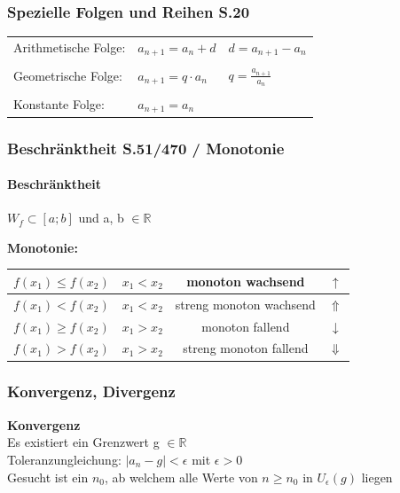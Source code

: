 		\subsubsection{Spezielle Folgen und Reihen S.20}
			\begin{tabular}{lll}
				Arithmetische Folge: & $a_{n+1} = a_n + d$ & $d = a_{n+1} - a_n$ \\
				\\
				Geometrische Folge: & $a_{n+1} = q \cdot a_n $ & $q = \frac{a_{n+1}}{a_n}$ \\
				\\
				Konstante Folge: & $a_{n+1} = a_n$  & \\
			\end{tabular}				
				
		\subsubsection{Beschränktheit S.51/470 / Monotonie}
			\paragraph{Beschränktheit}
				$W_f \subset [a ; b]$ und a, b $\in \mathbb{R}$		
			
			\textbf{Monotonie:} \\
			
			\begin{tabular}{|c|c|c|c|}
				\hline
				$f(x_1) \leq f(x_2)$ & $x_1 < x_2$ & monoton wachsend & $\uparrow$\\
				\hline
				$f(x_1) < f(x_2)$ & $x_1 < x_2$ & streng monoton wachsend & $\Uparrow$\\
				\hline
				$f(x_1) \geq f(x_2)$ & $x_1 > x_2$ & monoton fallend & $\downarrow$\\
				\hline
				$f(x_1) > f(x_2)$ & $x_1 > x_2$ & streng monoton fallend & $\Downarrow$\\
				\hline
			\end{tabular}
			
		\subsubsection{Konvergenz, Divergenz}
			\textbf{Konvergenz} \\
				Es existiert ein Grenzwert g $\in \mathbb{R}$ \\
				Toleranzungleichung: $\vert a_n - g \vert < \epsilon$  mit $\epsilon > 0$ \\
				Gesucht ist ein $n_0$, ab welchem alle Werte von $n \geq n_0$ in $U_\epsilon(g)$ liegen \\
				
